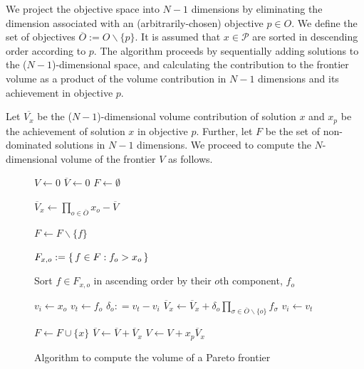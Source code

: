 We project the objective space into $N-1$ dimensions by eliminating the dimension associated with an (arbitrarily-chosen) objective $p \in O$. We define the set of objectives $\overbar{O} := O \backslash \{p\}$. It is assumed that $x \in \mathcal{P}$ are sorted in descending order according to $p$. The algorithm proceeds by sequentially adding solutions to the ($N-1$)-dimensional space, and calculating the contribution to the frontier volume as a product of the volume contribution in $N-1$ dimensions and its achievement in objective $p$.

Let
$\overbar{V_x}$ be the ($N-1$)-dimensional volume contribution of solution $x$ and
$x_p$ be the achievement of solution $x$ in objective $p$. Further, let
$F$ be the set of non-dominated solutions in $N-1$ dimensions.
We proceed to compute the $N$-dimensional volume of the frontier $V$ as follows.

\begin{figure}[!ht]
\caption{Algorithm to compute the volume of a Pareto frontier}
\begin{algorithmic}[1]

\State $V \gets 0$
\State $\overbar{V} \gets 0$
\State $F \gets \emptyset$


	\State $\overbar{V}_x \gets \prod_{o \in \overbar{O}} x_{o} - \overbar{V}$
		
			\State $F \gets F \backslash \{f\}$
		\EndIf
	\EndFor
	
	
		\State $F_{x,o} := \set{f \in F : f_o > x_o}$
		
		\State Sort $f \in F_{x,o}$ in ascending order by their $o$th component, $f_o$
		
		\State $v_i \gets x_o$
			\State $v_t \gets f_o$
			\State $\delta_o :	= v_t - v_i$
			\State $\overbar{V}_x \gets \overbar{V}_x + \delta_o \prod_{\sigma \in \overbar{O} \backslash \{o\}} f_\sigma$
			\State $v_i \gets v_t$
		\EndFor
		
	\EndFor
	
	\State $F \gets F \cup \{x\}$
	\State $\overbar{V} \gets \overbar{V} + \overbar{V}_x$
	\State $V \gets V + x_p \overbar{V}_x$
\EndFor


\end{algorithmic}
\end{figure}